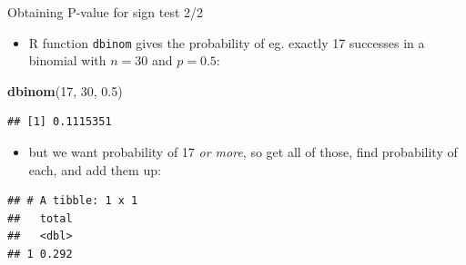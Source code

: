 \documentclass[ignorenonframetext,]{beamer}
\newenvironment{Shaded}{\begin{snugshade}}{\end{snugshade}}
\newcommand{\DataTypeTok}[1]{\textcolor[rgb]{0.13,0.29,0.53}{#1}}
\newcommand{\DecValTok}[1]{\textcolor[rgb]{0.00,0.00,0.81}{#1}}
\newcommand{\FloatTok}[1]{\textcolor[rgb]{0.00,0.00,0.81}{#1}}
\newcommand{\KeywordTok}[1]{\textcolor[rgb]{0.13,0.29,0.53}{\textbf{#1}}}
\newcommand{\NormalTok}[1]{#1}
\newcommand{\OperatorTok}[1]{\textcolor[rgb]{0.81,0.36,0.00}{\textbf{#1}}}
\newcommand{\StringTok}[1]{\textcolor[rgb]{0.31,0.60,0.02}{#1}}
\providecommand{\tightlist}{%
  \setlength{\itemsep}{0pt}\setlength{\parskip}{0pt}}
\begin{document}
\begin{frame}[fragile]{Obtaining P-value for sign test 2/2}
\protect\hypertarget{obtaining-p-value-for-sign-test-22}{}

\begin{itemize}
\tightlist
\item
  R function \texttt{dbinom} gives the probability of eg. exactly 17
  successes in a binomial with \(n = 30\) and \(p = 0.5\):
\end{itemize}

\begin{Shaded}
\begin{Highlighting}[]
\KeywordTok{dbinom}\NormalTok{(}\DecValTok{17}\NormalTok{, }\DecValTok{30}\NormalTok{, }\FloatTok{0.5}\NormalTok{)}
\end{Highlighting}
\end{Shaded}

\begin{verbatim}
## [1] 0.1115351
\end{verbatim}

\begin{itemize}
\tightlist
\item
  but we want probability of 17 \emph{or more}, so get all of those,
  find probability of each, and add them up:
\end{itemize}

\begin{Shaded}
\end{Shaded}

\begin{verbatim}
## # A tibble: 1 x 1
##   total
##   <dbl>
## 1 0.292
\end{verbatim}

\end{frame}
\end{document}
